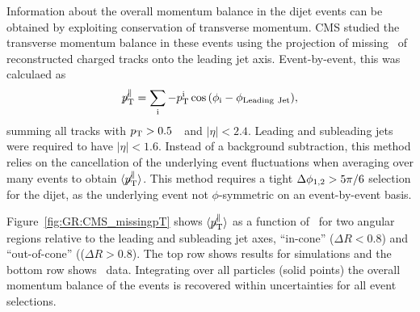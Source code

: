 Information about the overall momentum balance in the dijet events can be obtained by exploiting
conservation of transverse momentum. CMS studied the transverse momentum balance in these events
using the projection of missing \pT\ of reconstructed charged tracks onto the leading jet axis. 
Event-by-event, this was calculaed as 
\begin{equation}
\displaystyle{\not} p_{\mathrm{T}}^{\parallel} =
\sum_{\rm i}{ -p_{\mathrm{T}}^{\rm i}\cos{(\phi_{\rm i}-\phi_{\rm Leading\ Jet})}},
\end{equation}
summing all tracks with $\mbox{$p_{\mathrm{T}}$} > 0.5$~\GeVc\ and $|\eta| < 2.4$. 
Leading and subleading jets were required to have $|\eta| < 1.6$.
Instead of a background subtraction, this method relies on the cancellation of the 
underlying event fluctuations when averaging over many events to obtain 
$\langle \displaystyle{\not} p_{\mathrm{T}}^{\parallel} \rangle$.
This method requires a tight $\Delta\phi_{1,2} > 5 \pi/6$ selection for the dijet, as the underlying 
event not $\phi$-symmetric on an event-by-event basis.

Figure~\ref{fig:GR:CMS_missingpT} shows $\langle \displaystyle{\not} p_{\mathrm{T}}^{\parallel} \rangle$
as a function of \AJ\ for two angular regions relative to the leading and subleading 
jet axes, ``in-cone'' ($\Delta R < 0.8$) and ``out-of-cone'' (($\Delta R > 0.8$). 
The top row shows results for  {} simulations and the bottom row shows
\PbPb\ data. Integrating over all particles (solid points) the overall momentum balance of the events
is recovered within uncertainties for all event selections.

